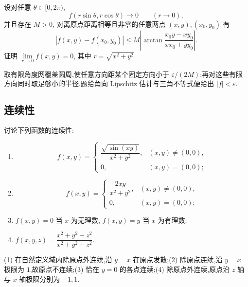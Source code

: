 \begin{example}
    设对任意 $\theta\in\lbrack0,2\pi)$,
    \[
        f(r\sin\theta,r\cos\theta)\to0\qquad(r\to0),
    \]
    并且存在 $M>0$, 对离原点距离相等且非零的任意两点 $(x,y),(x_0,y_0)$ 有
    \[
        |f(x,y)-f(x_0,y_0)|
        \leq M\left|\arctan\dfrac{x_0y-xy_0}{xx_0+yy_0}\right|.
    \]
    证明 $\displaystyle\lim\limits_{r\to0}f(x,y)=0$, 其中 $r=\sqrt{x^2+y^2}$.
\end{example}
\exampleblank

\begin{solution}
    取有限角度网覆盖圆周,使任意方向距某个固定方向小于 $\varepsilon/(2M)$;再对这些有限方向同时取足够小的半径.题给角向 Lipschitz 估计与三角不等式便给出 $|f|<\varepsilon$.
\end{solution}



\subsection{连续性}

\begin{example}
    讨论下列函数的连续性:
    \begin{enumerate}
        \item
              \[
                  f(x,y)=
                  \begin{cases}
                      \dfrac{\sqrt{\sin(xy)}}{x^2+y^2}, & (x,y)\ne(0,0), \\
                      0,                                & (x,y)=(0,0);
                  \end{cases}
              \]
        \item
              \[
                  f(x,y)=
                  \begin{cases}
                      \dfrac{2xy}{x^2+y^2}, & (x,y)\ne(0,0), \\
                      0,                    & (x,y)=(0,0);
                  \end{cases}
              \]
        \item $f(x,y)=0$ 当 $x$ 为无理数, $f(x,y)=y$ 当 $x$ 为有理数;
        \item $\displaystyle f(x,y,z)=\dfrac{x^2+y^2-z^2}{x^2+y^2+z^2}$.
    \end{enumerate}
\end{example}
\exampleblank

\begin{solution}
    (1) 在自然定义域内除原点外连续,沿 $y=x$ 在原点发散;(2) 除原点连续,沿 $y=x$ 极限为 $1$,故原点不连续;(3) 恰在 $y=0$ 的各点连续;(4) 除原点外连续,原点沿 $z$ 轴与 $x$ 轴极限分别为 $-1,1$.
\end{solution}

